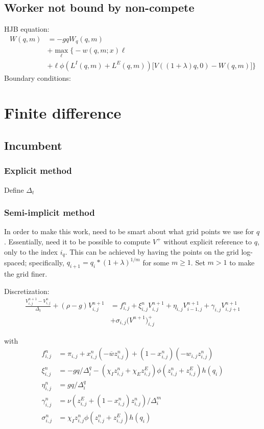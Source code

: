 \documentclass[12pt,english]{article}
\theoremstyle{remark}
\begin{document}
\subsection*{Worker not bound by non-compete}
HJB equation:
\begin{align*}
W(q,m) &= -gqW_q(q,m) \\
	   &+ \max_{\ell} \big\{-w(q,m;x)\ell \\
	   &+ \ell \phi (L^I(q,m) + L^E(q,m)) \big[ V((1+\lambda)q,0)-W(q,m) \big]\big\}
\end{align*}
Boundary conditions: 

\section*{Finite difference}

\subsection*{Incumbent}
\subsubsection*{Explicit method}

Define $\Delta_t$ 


\subsubsection{Semi-implicit method}
In order to make this work, need to be smart about what grid points we use for $q$. Essentially, need it to be possible to compute $V^+$ without explicit reference to $q$, only to the index $i_q$. This can be achieved by having the points on the grid log-spaced; specifically, $q_{i+1} = q_i * (1+\lambda)^{1/m}$ for some $m \ge 1$. Set $m > 1$ to make the grid finer. 

Discretization:  
\begin{align*}
\frac{V_{i,j}^{n+1} - V_{i,j}^n}{\Delta_t} + (\rho - g) V_{i,j}^{n+1} &= f_{i,j}^n + \xi_{i,j}^n V_{i,j}^{n+1} + \eta_{i,j} V_{i-1,j}^{n+1} + \gamma_{i,j} V_{i,j+1}^{n+1} \\
					&+ \sigma_{i,j} \big(V^{n+1}\big)^+_{i,j}
\end{align*}

with 
\begin{align*}
f_{i,j}^n &= \pi_{i,j} + x_{i,j}^n (-\overline{w} z_{i,j}^n) + (1-x_{i,j}^n) (-w_{i,j} z_{i,j}^n) \\
\xi_{i,j}^n &= -gq/\Delta^q_i - (\chi_I z_{i,j}^n + \chi_E z_{i,j}^E) \phi(z_{i,j}^n +z_{i,j}^E) h(q_i) \\
\eta_{i,j}^n &= gq/\Delta^q_i \\
\gamma_{i,j}^n &= \nu(z_{i,j}^E + (1-x_{i,j}^n)z_{i,j}^n) / \Delta^m_i \\
\sigma_{i,j}^n &= \chi_I z_{i,j}^n \phi (z_{i,j}^n + z_{i,j}^E) h(q_i)
\end{align*}
\end{document}
